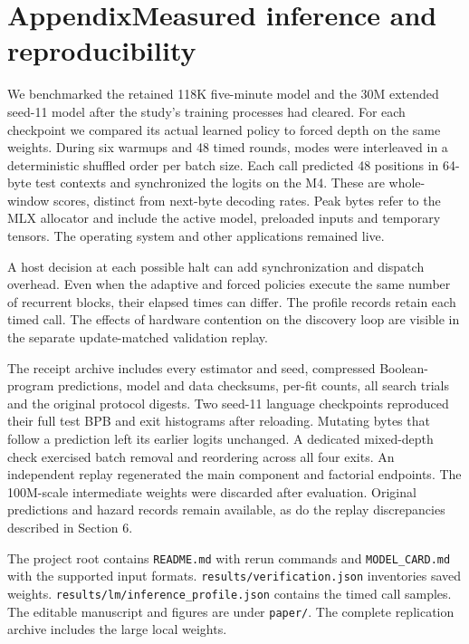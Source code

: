 \section*{Appendix\quad Measured inference and reproducibility}
 We benchmarked the retained 118K five-minute model and the 30M extended seed-11 model after the study's training processes had cleared. For each checkpoint we compared its actual learned policy to forced depth on the same weights. During six warmups and 48 timed rounds, modes were interleaved in a deterministic shuffled order per batch size. Each call predicted 48 positions in 64-byte test contexts and synchronized the logits on the M4. These are whole-window scores, distinct from next-byte decoding rates. Peak bytes refer to the MLX allocator and include the active model, preloaded inputs and temporary tensors. The operating system and other applications remained live.


 A host decision at each possible halt can add synchronization and dispatch overhead. Even when the adaptive and forced policies execute the same number of recurrent blocks, their elapsed times can differ. The profile records retain each timed call. The effects of hardware contention on the discovery loop are visible in the separate update-matched validation replay.

 The receipt archive includes every estimator and seed, compressed Boolean-program predictions, model and data checksums, per-fit counts, all search trials and the original protocol digests. Two seed-11 language checkpoints reproduced their full test BPB and exit histograms after reloading. Mutating bytes that follow a prediction left its earlier logits unchanged. A dedicated mixed-depth check exercised batch removal and reordering across all four exits. An independent replay regenerated the main component and factorial endpoints. The 100M-scale intermediate weights were discarded after evaluation. Original predictions and hazard records remain available, as do the replay discrepancies described in Section 6.

 The project root contains \texttt{README.md} with rerun commands and \texttt{MODEL\_CARD.md} with the supported input formats. \texttt{results/verification.json} inventories saved weights. \texttt{results/lm/inference\_profile.json} contains the timed call samples. The editable manuscript and figures are under \texttt{paper/}. The complete replication archive includes the large local weights.
